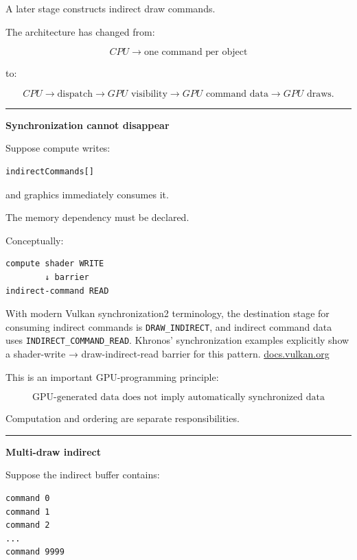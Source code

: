A later stage constructs indirect draw commands.

The architecture has changed from:

\[
CPU\rightarrow\text{one command per object}
\]

to:

\[
CPU\rightarrow\text{dispatch}
\rightarrow
GPU\text{ visibility}
\rightarrow
GPU\text{ command data}
\rightarrow
GPU\text{ draws}.
\]

\begin{center}\rule{0.5\linewidth}{0.5pt}\end{center}

\textbf{Synchronization cannot disappear}

Suppose compute writes:

\begin{verbatim}
indirectCommands[]
\end{verbatim}

and graphics immediately consumes it.

The memory dependency must be declared.

Conceptually:

\begin{verbatim}
compute shader WRITE
        ↓ barrier
indirect-command READ
\end{verbatim}

With modern Vulkan synchronization2 terminology, the destination stage for consuming indirect commands is \texttt{DRAW\_INDIRECT}, and indirect command data uses \texttt{INDIRECT\_COMMAND\_READ}. Khronos' synchronization examples explicitly show a shader-write → draw-indirect-read barrier for this pattern. \href{https://docs.vulkan.org/spec/latest/chapters/synchronization.html?utm_source=chatgpt.com}{docs.vulkan.org}

This is an important GPU-programming principle:

\[
\boxed{
\text{GPU-generated data does not imply automatically synchronized data}
}
\]

Computation and ordering are separate responsibilities.

\begin{center}\rule{0.5\linewidth}{0.5pt}\end{center}

\textbf{Multi-draw indirect}

Suppose the indirect buffer contains:

\begin{verbatim}
command 0
command 1
command 2
...
command 9999
\end{verbatim}

